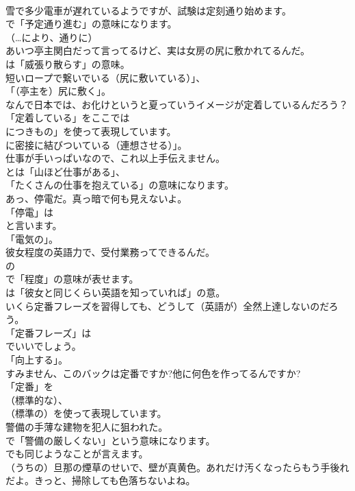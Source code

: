 \documentclass[8pt]{extreport}
\begin{document}
\begin{CJK}{UTF8}{min}
\\	雪で多少電車が遅れているようですが、試験は定刻通り始めます。 
\\	で「予定通り進む」の意味になります。
\\	（…により、通りに）	
\\	あいつ亭主関白だって言ってるけど、実は女房の尻に敷かれてるんだ。 
\\	は「威張り散らす」の意味。
\\	短いロープで繋いでいる（尻に敷いている）」、
\\	「（亭主を）尻に敷く」。	
\\	なんで日本では、お化けというと夏っていうイメージが定着しているんだろう？ 
\\	「定着している」をここでは
\\	につきもの」を使って表現しています。
\\	に密接に結びついている（連想させる）」。	
\\	仕事が手いっぱいなので、これ以上手伝えません。 
\\	とは「山ほど仕事がある」、
\\	「たくさんの仕事を抱えている」の意味になります。	
\\	あっ、停電だ。真っ暗で何も見えないよ。 
\\	「停電」は
\\	と言います。
\\	「電気の」。	
\\	彼女程度の英語力で、受付業務ってできるんだ。 
\\	の
\\	で「程度」の意味が表せます。
\\	は「彼女と同じくらい英語を知っていれば」の意。	
\\	いくら定番フレーズを習得しても、どうして（英語が）全然上達しないのだろう。 
\\	「定番フレーズ」は
\\	でいいでしょう。
\\	「向上する」。	
\\	すみません、このバックは定番ですか?他に何色を作ってるんですか? 
\\	「定番」を
\\	（標準的な）、
\\	（標準の）を使って表現しています。	
\\	警備の手薄な建物を犯人に狙われた。 
\\	で「警備の厳しくない」という意味になります。
\\	でも同じようなことが言えます。	
\\	（うちの）旦那の煙草のせいで、壁が真黄色。あれだけ汚くなったらもう手後れだよ。きっと、掃除しても色落ちないよね。 

\end{CJK}
\end{document}
